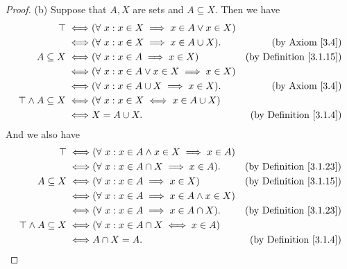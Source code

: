 \begin{proof}{(b)}
    Suppose that \(A, X\) are sets and \(A \subseteq X\).
    Then we have
    \begin{align*}
        \top \iff                     & (\forall\ x : x \in X \implies x \in A \lor x \in X)                                       \\
        \iff                          & (\forall\ x : x \in X \implies x \in A \cup X).      & \text{(by Axiom \ref{3.4})}         \\
        A \subseteq X \iff            & (\forall\ x : x \in A \implies x \in X)              & \text{(by Definition \ref{3.1.15})} \\
        \iff                          & (\forall\ x : x \in A \lor x \in X \implies x \in X)                                       \\
        \iff                          & (\forall\ x : x \in A \cup X \implies x \in X).      & \text{(by Axiom \ref{3.4})}         \\
        \top \land A \subseteq X \iff & (\forall\ x : x \in X \iff x \in A \cup X)                                                 \\
        \iff                          & X = A \cup X.                                        & \text{(by Definition \ref{3.1.4})}
    \end{align*}
    And we also have
    \begin{align*}
        \top \iff                     & (\forall\ x : x \in A \land x \in X \implies x \in A)                                       \\
        \iff                          & (\forall\ x : x \in A \cap X \implies x \in A).       & \text{(by Definition \ref{3.1.23})} \\
        A \subseteq X \iff            & (\forall\ x : x \in A \implies x \in X)               & \text{(by Definition \ref{3.1.15})} \\
        \iff                          & (\forall\ x : x \in A \implies x \in A \land x \in X)                                       \\
        \iff                          & (\forall\ x : x \in A \implies x \in A \cap X).       & \text{(by Definition \ref{3.1.23})} \\
        \top \land A \subseteq X \iff & (\forall\ x : x \in A \cap X \iff x \in A)                                                  \\
        \iff                          & A \cap X = A.                                         & \text{(by Definition \ref{3.1.4})}
    \end{align*}
\end{proof}

